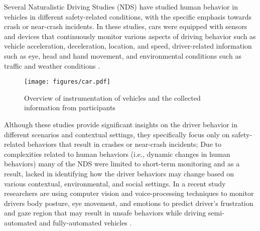 Several Naturalistic Driving Studies (NDS) have studied human behavior in vehicles in different safety-related conditions, with the specific emphasis towards crash or near-crash incidents. 
In these studies, cars were equipped with sensors and devices that continuously monitor various aspects of driving behavior such as vehicle acceleration, deceleration, location, and speed, driver-related information such as eye, head and hand movement, and environmental conditions such as traffic and weather conditions \cite{eenink2014udrive, simons2015naturalistic, fridman2017autonomous, klauer2006impact, victor2015analysis, papazikou2017detecting}. 
\begin{figure}
    \centering
    \texttt{[image: figures/car.pdf]}
    \caption{Overview of instrumentation of vehicles and the collected information from participants}
    \label{fig:sensors}
\end{figure}
Although these studies provide significant insights on the driver behavior in different scenarios and contextual settings, they specifically focus only on safety-related behaviors that result in crashes or near-crash incidents; 
Due to complexities related to human behaviors (i.e., dynamic changes in human behaviors) many of the NDS were limited to short-term monitoring and as a result, lacked in identifying how the driver behaviors may change based on various contextual, environmental, and social settings. 
In a recent study researchers are using computer vision and voice-processing techniques to monitor drivers body posture, eye movement, and emotions to predict driver's frustration and gaze region that may result in unsafe behaviors while driving semi-automated and fully-automated vehicles \cite{fridman2017autonomous, abdic2016driver, fridman2016driver, fridman2018cognitive, fridman2016owl}. 
  
